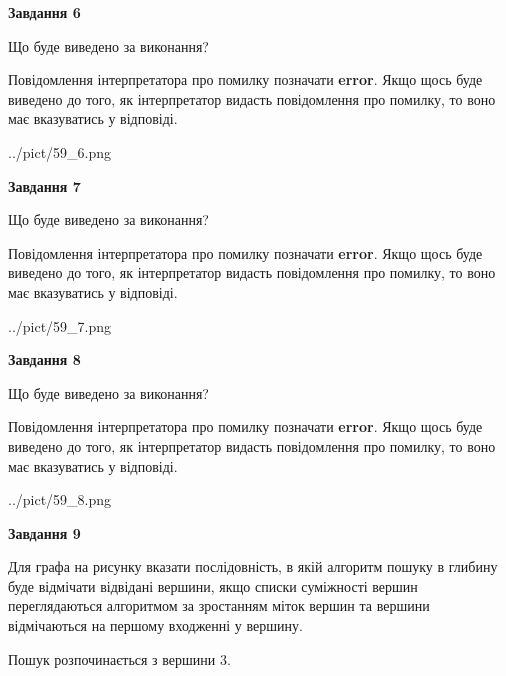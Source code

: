 \documentclass[12pt, ukrainian]{article}
\begin{document}
{\begin {large}
{\begin {center}\textbf{Завдання 6}\end {center}}\par
Що буде виведено за виконання?

Повідомлення інтерпретатора про помилку позначати \textbf{error}.
Якщо щось буде виведено до того, як інтерпретатор видасть повідомлення про помилку, 
то воно має вказуватись у відповіді. \par


\begin{center}
	{../pict/59_6.png}
\end{center}
\newpage

{\begin {center}\textbf{Завдання 7}\end {center}}\par
Що буде виведено за виконання?

Повідомлення інтерпретатора про помилку позначати \textbf{error}.
Якщо щось буде виведено до того, як інтерпретатор видасть повідомлення про помилку, 
то воно має вказуватись у відповіді. \par


\begin{center}
	{../pict/59_7.png}
\end{center}
\newpage

{\begin {center}\textbf{Завдання 8}\end {center}}\par
Що буде виведено за виконання?

Повідомлення інтерпретатора про помилку позначати \textbf{error}.
Якщо щось буде виведено до того, як інтерпретатор видасть повідомлення про помилку, 
то воно має вказуватись у відповіді. \par


\begin{center}
	{../pict/59_8.png}
\end{center}
\newpage

{\begin {center}\textbf{Завдання 9}\end {center}}\par
Для графа на рисунку вказати послідовність, в якій алгоритм пошуку в глибину буде відмічати відвідані вершини, якщо списки суміжності вершин переглядаються алгоритмом за зростанням міток вершин та вершини відмічаються на першому вход\-женні у вершину.\par
Пошук розпочинається з вершини 3.\par


\end{large}}
\end{document}
